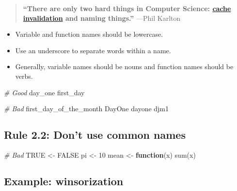 \documentclass[
  letterpaper,
  DIV=11,
  numbers=noendperiod]{scrreprt}
\newenvironment{Shaded}{}{}
\newcommand{\CommentTok}[1]{\textcolor[rgb]{0.38,0.63,0.69}{\textit{#1}}}
\newcommand{\ConstantTok}[1]{\textcolor[rgb]{0.53,0.00,0.00}{#1}}
\newcommand{\ControlFlowTok}[1]{\textcolor[rgb]{0.00,0.44,0.13}{\textbf{#1}}}
\newcommand{\DecValTok}[1]{\textcolor[rgb]{0.25,0.63,0.44}{#1}}
\newcommand{\FunctionTok}[1]{\textcolor[rgb]{0.02,0.16,0.49}{#1}}
\newcommand{\NormalTok}[1]{#1}
\newcommand{\OtherTok}[1]{\textcolor[rgb]{0.00,0.44,0.13}{#1}}
\providecommand{\tightlist}{%
  \setlength{\itemsep}{0pt}\setlength{\parskip}{0pt}}\usepackage{longtable,booktabs,array}
\begin{document}
\begin{quote}
\textbf{``There are only two hard things in Computer Science:
\href{https://en.wikipedia.org/wiki/Cache_invalidation}{cache
invalidation} and naming things.''} ---Phil Karlton
\end{quote}

\begin{itemize}
\tightlist
\item
  Variable and function names should be lowercase.
\item
  Use an underscore to separate words within a name.
\item
  Generally, variable names should be nouns and function names should be
  verbs.
\end{itemize}

\begin{Shaded}
\begin{Highlighting}[]
\CommentTok{\# Good}
\NormalTok{day\_one}
\NormalTok{first\_day}

\CommentTok{\# Bad}
\NormalTok{first\_day\_of\_the\_month}
\NormalTok{DayOne}
\NormalTok{dayone}
\NormalTok{djm1}
\end{Highlighting}
\end{Shaded}

\subsection{Rule 2.2: Don't use common
names}\label{rule-2.2-dont-use-common-names}

\begin{Shaded}
\begin{Highlighting}[]
\CommentTok{\# Bad}
\ConstantTok{TRUE} \OtherTok{\textless{}{-}} \ConstantTok{FALSE}
\NormalTok{pi }\OtherTok{\textless{}{-}} \DecValTok{10}
\NormalTok{mean }\OtherTok{\textless{}{-}} \ControlFlowTok{function}\NormalTok{(x) }\FunctionTok{sum}\NormalTok{(x)}
\end{Highlighting}
\end{Shaded}

\subsection{Example: winsorization}\label{example-winsorization}
\end{document}
